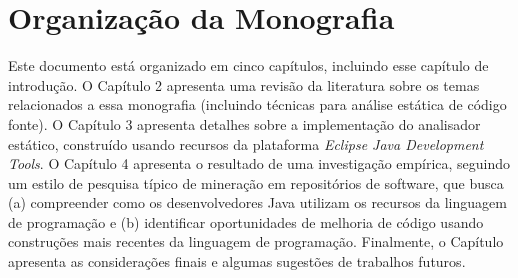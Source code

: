 
\section{Organiza\c c\~{a}o da Monografia} 

Este documento est\'{a} organizado em cinco cap\'{i}tulos, incluindo esse cap\'{i}tulo de 
introdu\c c\~{a}o. O Cap\'{i}tulo 2 apresenta uma revis\~{a}o da literatura sobre os 
temas relacionados a essa monografia (incluindo t\'{e}cnicas para an\'{a}lise est\'{a}tica 
de c\'{o}digo fonte). O Cap\'{i}tulo 3 apresenta detalhes sobre a implementa\c c\~{a}o do 
analisador est\'{a}tico, constru\'{i}do usando recursos da plataforma \emph{Eclipse Java 
Development Tools}. O Cap\'{i}tulo 4 apresenta o resultado de uma investiga\c c\~{a}o 
emp\'{i}rica, seguindo um estilo de pesquisa t\'{i}pico de minera\c c\~{a}o em 
reposit\'{o}rios de software, que busca (a) compreender como os desenvolvedores 
Java utilizam os recursos da linguagem de programa\c c\~{a}o e (b) identificar 
oportunidades de melhoria de c\'{o}digo usando constru\c c\~{o}es mais 
recentes da linguagem de programa\c c\~{a}o. Finalmente, o Cap\'{i}tulo 
apresenta as considera\c c\~{o}es finais e algumas sugest\~{o}es de 
trabalhos futuros. 
